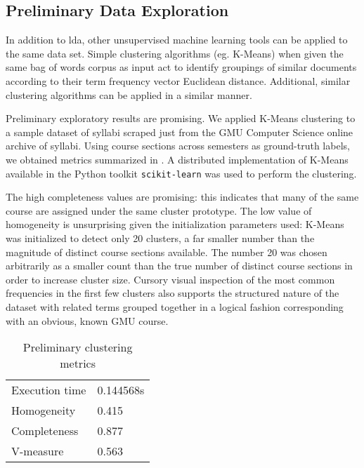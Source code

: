 
\subsection{Preliminary Data Exploration}
\label{sec:data-exploration}


In addition to \ac{lda}, other unsupervised machine learning tools can be applied to the same data set.
Simple clustering algorithms (eg. K-Means) when given the same bag of words corpus as input act to identify groupings of similar documents according to their term frequency vector Euclidean distance. \cite{lloyd1982}
Additional, similar clustering algorithms can be applied in a similar manner.


Preliminary exploratory results are promising.
We applied K-Means clustering to a sample dataset of syllabi scraped just from the GMU Computer Science online archive of syllabi.
Using course sections across semesters as ground-truth labels, we obtained metrics summarized in .
A distributed implementation of K-Means available in the Python toolkit \texttt{scikit-learn} was used to perform the clustering.


The high completeness values are promising: this indicates that many of the same course are assigned under the same cluster prototype.
The low value of homogeneity is unsurprising given the initialization parameters used: K-Means was initialized to detect only 20 clusters, a far smaller number than the magnitude of distinct course sections available.
The number 20 was chosen arbitrarily as a smaller count than the true number of distinct course sections in order to increase cluster size.
Cursory visual inspection of the most common frequencies in the first few clusters also supports the structured nature of the dataset with related terms grouped together in a logical fashion corresponding with an obvious, known GMU course.


\begin{table}[ht]
\centering
\begin{tabular}{ll}
\toprule
Execution time & 0.144568s \\
Homogeneity & 0.415 \\
Completeness & 0.877 \\
V-measure & 0.563 \\
\bottomrule
\end{tabular}
\caption{Preliminary clustering metrics\label{table:cluster-metrics}}
\end{table}

